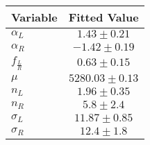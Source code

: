 \begin{tabular}[t]{lc}
\hline
Variable &Fitted Value\\
\hline\hline
$\alpha_L$&$1.43\pm0.21$\\
\hline
$\alpha_R$&$-1.42\pm0.19$\\
\hline
$f_{\frac{L}{R}}$&$0.63\pm0.15$\\
\hline
$\mu$&$5280.03\pm0.13$\\
\hline
$n_L$&$1.96\pm0.35$\\
\hline
$n_R$&$5.8\pm2.4$\\
\hline
$\sigma_L$&$11.87\pm0.85$\\
\hline
$\sigma_R$&$12.4\pm1.8$\\
\hline
\end{tabular}